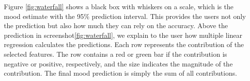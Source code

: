 \documentclass[conference]{IEEEtran}
\begin{document}
Figure \ref{fig:waterfall} shows a black box with whiskers on a scale, which is the mood estimate with the 95\% prediction interval. This provides the users not only the prediction but also how much they can rely on the accuracy.
Above the prediction in screenshot\ref{fig:waterfall}, we explain to the user how multiple linear regression calculates the predictions. Each row represents the contribution of the selected features. The row contains a red or green bar if the contribution is negative or positive, respectively, and the size indicates the magnitude of the contribution. The final mood prediction is simply the sum of all contributions.

\begin{figure}[htbp]
    \centering
    

\end{figure}
\end{document}
